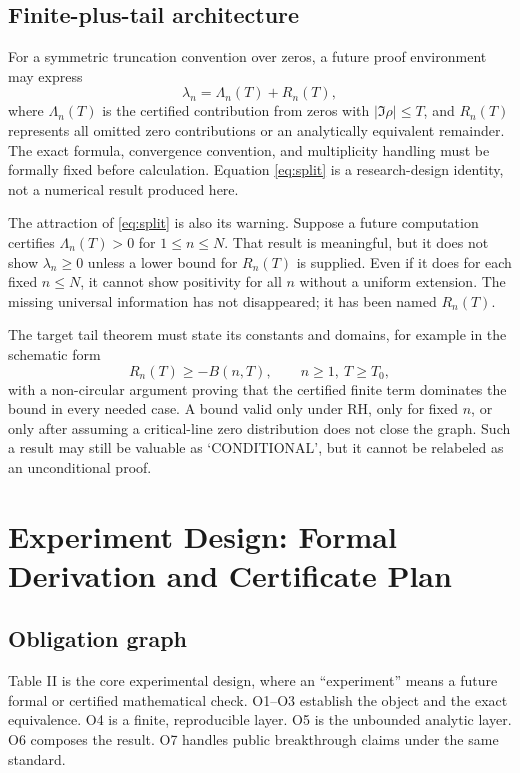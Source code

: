 \documentclass[conference]{../../../../Conference-LaTeX-template_10-17-19/IEEEtran}
\begin{document}
\subsection{Finite-plus-tail architecture}
For a symmetric truncation convention over zeros, a future proof environment may express
\begin{equation}
 \lambda_n=\Lambda_n(T)+R_n(T),
\label{eq:split}
\end{equation}
where $\Lambda_n(T)$ is the certified contribution from zeros with $|\Im\rho|\le T$, and $R_n(T)$ represents all omitted zero contributions or an analytically equivalent remainder. The exact formula, convergence convention, and multiplicity handling must be formally fixed before calculation. Equation \eqref{eq:split} is a research-design identity, not a numerical result produced here.

The attraction of \eqref{eq:split} is also its warning. Suppose a future computation certifies $\Lambda_n(T)>0$ for $1\le n\le N$. That result is meaningful, but it does not show $\lambda_n\ge0$ unless a lower bound for $R_n(T)$ is supplied. Even if it does for each fixed $n\le N$, it cannot show positivity for all $n$ without a uniform extension. The missing universal information has not disappeared; it has been named $R_n(T)$.

The target tail theorem must state its constants and domains, for example in the schematic form
\begin{equation}
 R_n(T)\ge -B(n,T),\qquad n\ge1,\ T\ge T_0,
\label{eq:tail}
\end{equation}
with a non-circular argument proving that the certified finite term dominates the bound in every needed case. A bound valid only under RH, only for fixed $n$, or only after assuming a critical-line zero distribution does not close the graph. Such a result may still be valuable as `CONDITIONAL', but it cannot be relabeled as an unconditional proof.

\section{Experiment Design: Formal Derivation and Certificate Plan}
\subsection{Obligation graph}
Table II is the core experimental design, where an ``experiment'' means a future formal or certified mathematical check. O1--O3 establish the object and the exact equivalence. O4 is a finite, reproducible layer. O5 is the unbounded analytic layer. O6 composes the result. O7 handles public breakthrough claims under the same standard.
\end{document}
